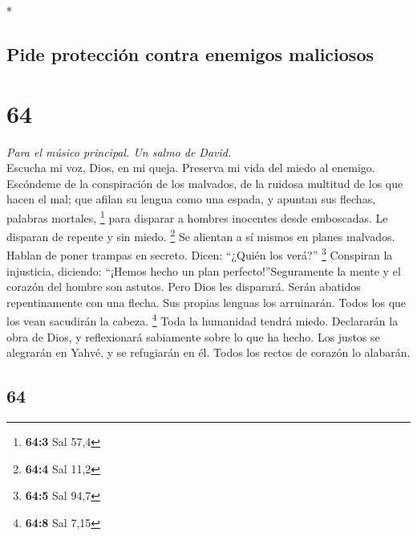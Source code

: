\begin{paracol}{2}
\begin{otherlanguage}{english}
\end{otherlanguage}

\switchcolumn[0]*

\hypertarget{pide-protecciuxf3n-contra-enemigos-maliciosos}{%
\subsection{Pide protección contra enemigos
maliciosos}\label{pide-protecciuxf3n-contra-enemigos-maliciosos}}

\hypertarget{section-126}{%
\section{64}\label{section-126}}

\emph{Para el músico principal. Un salmo de David.}\\
 Escucha mi voz, Dios, en mi queja. Preserva mi vida del
miedo al enemigo.  Escóndeme de la conspiración de los
malvados, de la ruidosa multitud de los que hacen el mal; 
que afilan su lengua como una espada, y apuntan sus flechas, palabras
mortales, \footnote{\textbf{64:3} Sal 57,4}  para disparar
a hombres inocentes desde emboscadas. Le disparan de repente y sin
miedo. \footnote{\textbf{64:4} Sal 11,2}  Se alientan a sí
mismos en planes malvados. Hablan de poner trampas en secreto. Dicen:
``¿Quién los verá?'' \footnote{\textbf{64:5} Sal 94,7} 
Conspiran la injusticia, diciendo: ``¡Hemos hecho un plan
perfecto!''Seguramente la mente y el corazón del hombre son astutos.
 Pero Dios les disparará. Serán abatidos repentinamente
con una flecha.  Sus propias lenguas los arruinarán. Todos
los que los vean sacudirán la cabeza. \footnote{\textbf{64:8} Sal 7,15}
 Toda la humanidad tendrá miedo. Declararán la obra de
Dios, y reflexionará sabiamente sobre lo que ha hecho. 
Los justos se alegrarán en Yahvé, y se refugiarán en él. Todos los
rectos de corazón lo alabarán.

\switchcolumn
\begin{otherlanguage}{english}

\hypertarget{section-127}{%
\section{64}\label{section-127}}


\end{otherlanguage}
\end{paracol}
